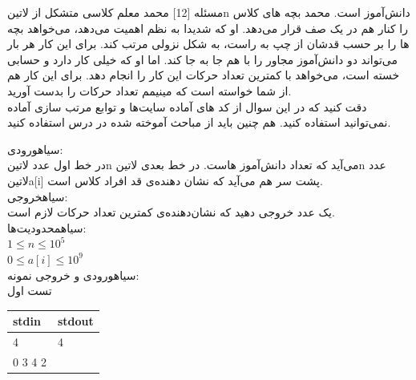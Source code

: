 ‌مسئله [12]
محمد معلم کلاسی متشکل از ‌لاتین{n} دانش‌آموز است. محمد بچه های کلاس را کنار هم در یک صف قرار می‌دهد. او که شدیدا به نظم اهمیت می‌دهد، می‌خواهد بچه ها را بر حسب قدشان از چپ به راست،‌ به شکل نزولی مرتب کند. برای این کار هر بار می‌تواند دو دانش‌آموز مجاور را با هم جا به جا کند. اما او که خیلی کار دارد و حسابی خسته است،‌ می‌خواهد با کمترین تعداد حرکات این کار را انجام دهد. برای این کار هم از شما خواسته است که مینیمم تعداد حرکات را بدست آورید.\\
دقت کنید که در این سوال از کد های آماده سایت‌ها و توابع مرتب سازی آماده نمی‌توانید استفاده کنید. هم چنین باید از مباحث آموخته شده در درس استفاده کنید.

‌سیاه{ورودی:}\\
در خط اول عدد ‌لاتین{n} می‌آید که تعداد دانش‌آموز هاست. در خط بعدی ‌لاتین{n} عدد ‌لاتین{a[i]} پشت سر هم می‌آید که نشان دهنده‌ی قد افراد کلاس است.\\
‌سیاه{خروجی:}\\
یک عدد خروجی دهید که نشان‌دهنده‌ی کمترین تعداد حرکات لازم است.\\
‌سیاه{محدودیت‌ها:}\\
$1 \leq n \leq 10^{5}$\\
$0 \leq a[i] \leq 10^{9}$\\

‌سیاه{ورودی و خروجی نمونه:}\\

تست اول
\begin{latin}
	\begin{tabularx}{\textwidth}{|X | X|}
		\hline
		\textbf{stdin} &
		\textbf{stdout}\\
		\hline
		4 & 4\\
		0 3 4 2&\\
		\hline
	\end{tabularx}
\end{latin}

